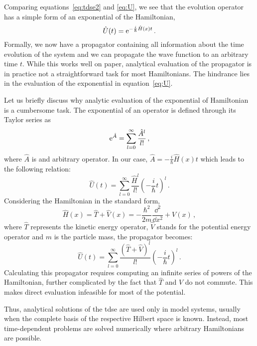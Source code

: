 Comparing equations~\eqref{eq:tdse2} and \eqref{eq:U}, we see that the evolution operator has a simple form of an exponential of the Hamiltonian,
\begin{equation}
    \hat{U}(t) = \mathrm{e}^{-\frac{i}{\hbar}\hat{H}(x)t} \, .
    \label{eq:U}
\end{equation}
Formally, we now have a propagator containing all information about the time evolution of the system and we can propagate the wave function to an arbitrary time $t$. While this works well on paper, analytical evaluation of the propagator is in practice not a straightforward task for most Hamiltonians. The hindrance lies in the evaluation of the exponential in equation~\eqref{eq:U}.

Let us briefly discuss why analytic evaluation of the exponential of Hamiltonian is a cumbersome task. The exponential of an operator is defined through its Taylor series as
\begin{equation}
    \mathrm{e}^{\hat{A}} = \sum_{l=0}^\infty \frac{\hat{A}^l}{l!} \, ,
\end{equation}
where $\hat{A}$ is and arbitrary operator. In our case, $\hat{A} = -\frac{i}{\hbar}\hat{H}(x)t$ which leads to the following relation:
\begin{equation}
    \hat{U}(t) = \sum_{l=0}^\infty \frac{\hat{H}^l}{l!} \left( -\frac{i}{\hbar} t\right)^l \, .
    \label{eq:U2}
\end{equation}
Considering the Hamiltonian in the standard form,
\begin{equation}
    \hat{H}(x) = \hat{T} + \hat{V}(x) = -\frac{\hbar^2}{2m}\frac{\dd^2}{\dd x^2} + V(x)\, ,
    \label{eq:Ham1}
\end{equation}
where $\hat{T}$ represents the kinetic energy operator, $\hat{V}$ stands for the potential energy operator and $m$ is the particle mass, the propagator becomes:
\begin{equation}
    \hat{U}(t) = \sum_{l=0}^\infty \frac{(\hat{T}+\hat{V})^l}{l!} \left( -\frac{i}{\hbar} t\right)^l \, .
    \label{eq:U3}
\end{equation}
Calculating this propagator requires computing an infinite series of powers of the Hamiltonian, further complicated by the fact that $\hat{T}$ and $\hat{V}$ do not commute. This makes direct evaluation infeasible for most of the potential.

Thus, analytical solutions of the \acrshort{tdse} are used only in model systems, usually when the complete basis of the respective Hilbert space is known. Instead, most time-dependent problems are solved numerically where arbitrary Hamiltonians are possible. 

